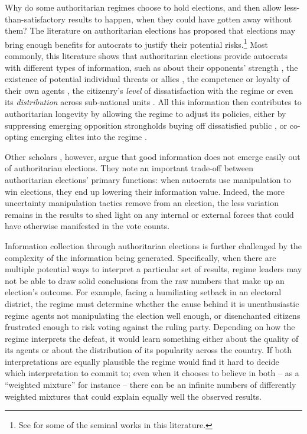 \documentclass[12pt]{article}
\newcommand\fnote[1]{\footnote{\baselineskip=2\normalbaselineskip#1}}
\newcommand{\1}{\mathbbm{1}}
\begin{document}
Why do some authoritarian regimes choose to hold elections, and then allow less-than-satisfactory results to happen, when they could have gotten away without them? The literature on authoritarian elections has proposed that elections may bring enough benefits for autocrats to justify their potential risks.\fnote{See \citet{LustOkar2005, AR2005, Magaloni2006, Blaydes2010, Miller2015, Cox2009, Geddes2018} for some of the seminal works in this literature.} Most commonly, this literature shows that authoritarian elections provide autocrats with different types of information, such as about their opponents' strength \citep{Geddes2018}, the existence of potential individual threats or allies \citep{LustOkar2005}, the competence or loyalty of their own agents \citep{Magaloni2006, Blaydes2010, Myagkov2009, RundlettSvolik2016}, the citizenry's \textit{level} of dissatisfaction with the regime \citep{Miller2015} or even its \textit{distribution} across sub-national units \citep{Magaloni2006, Blaydes2010}. All this information then contributes to authoritarian longevity by allowing the regime to adjust its policies, either by suppressing emerging opposition strongholds \citep{Magaloni2006, Blaydes2010} buying off dissatisfied public \citep{Miller2015, Magaloni2006}, or co-opting emerging elites into the regime \citep{LustOkar2005}.

Other scholars \citep[e.g.][]{Rozenas2016,Wintrobe2000, Morgenbesser2016}, however, argue that good information does not emerge easily out of authoritarian elections. They note an important trade-off between authoritarian elections' primary functions: when autocrats use manipulation to win elections, they end up lowering their information value. Indeed, the more uncertainty manipulation tactics remove from an election, the less variation remains in the results to shed light on any internal or external forces that could have otherwise manifested in the vote counts.

Information collection through authoritarian elections is further challenged by the complexity of the information being generated. Specifically, when there are multiple potential ways to interpret a particular set of results, regime leaders may not be able to draw solid conclusions from the raw numbers that make up an election's outcome. For example, facing a humiliating setback in an electoral district, the regime must determine whether the cause behind it is unenthusiastic regime agents not manipulating the election well enough, or disenchanted citizens frustrated enough to risk voting against the ruling party. Depending on how the regime interprets the defeat, it would learn something either about the quality of its agents or about the distribution of its popularity across the country. If both interpretations are equally plausible the regime would find it hard to decide which interpretation to commit to; even when it chooses to believe in both -- as a ``weighted mixture'' for instance -- there can be an infinite numbers of differently weighted mixtures that could explain equally well the observed results.
\end{document}

